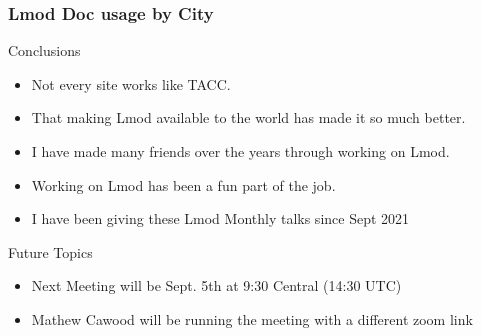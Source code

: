 \documentclass{beamer}
\begin{document}
\begin{frame}[fragile]
    \frametitle{Lmod Doc usage by City}
\end{frame}

\begin{frame}{Conclusions}
  \begin{itemize}
    \item Not every site works like TACC.
    \item That making Lmod available to the world has made it so much
      better.
    \item I have made many friends over the years through working on Lmod.
    \item Working on Lmod has been a fun part of the job.
    \item I have been giving these Lmod Monthly talks since Sept 2021
  \end{itemize}
\end{frame}


\begin{frame}{Future Topics}
  \begin{itemize}
    \item Next Meeting will be Sept. 5th at 9:30 Central (14:30 UTC)
    \item Mathew Cawood will be running the meeting with a different
      zoom link
  \end{itemize}
\end{frame}
\end{document}
